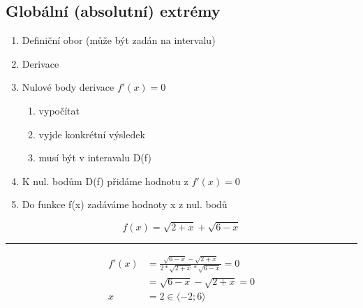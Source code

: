 \subsection{Globální (absolutní) extrémy}
\begin{enumerate}
  \item Definiční obor (může být zadán na intervalu)
  \item Derivace
  \item Nulové body derivace $f'(x)=0$
    \begin{enumerate}[label=(\alph*)]
      \item vypočítat
      \item vyjde konkrétní výsledek
      \item musí být v interavalu D(f)
    \end{enumerate}
  \item K nul. bodům D(f) přidáme hodnotu z $f'(x)=0$
  \item Do funkce f(x) zadáváme hodnoty x z nul. bodů
\end{enumerate}
\begin{equation}
  f(x)=\sqrt{2+x}+\sqrt{6-x}
\end{equation}
\hrule
\begin{align*}
  f'(x)&=\frac{\sqrt{6-x}-\sqrt{2+x}}{2*\sqrt{2+x}*\sqrt{6-x}}=0\\
       &=\sqrt{6-x}-\sqrt{2+x}=0\\
       x&=2\in\langle-2;6\rangle
\end{align*}
\begin{center}
\end{center}

